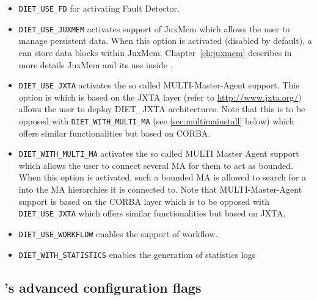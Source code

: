 \begin{itemize}
\item
  \verb+DIET_USE_FD+ for activating Fault Detector.

\item 
  \verb+DIET_USE_JUXMEM+ activates \diet support of JuxMem which
  allows the user to manage persistent data. When this option is
  activated (disabled by default), a \sed can store data blocks within
  JuxMem. Chapter~\ref{ch:juxmem} describes in more details JuxMem
  and its use inside \diet.

\item
  \verb+DIET_USE_JXTA+ activates the so called MULTI-Master-Agent
  support. This option is which is based on the JXTA layer (refer to
  \url{http://www.jxta.org/}) allows the user to deploy DIET\_JXTA
  architectures. Note that this is to be opposed with
  \verb+DIET_WITH_MULTI_MA+ (see \ref{sec:multimainstall} below) which
  offers similar functionalities but based on CORBA.

\item
  \label{sec:multimainstall}
  \verb+DIET_WITH_MULTI_MA+ activates the so called MULTI Master Agent
  support which allows the user to connect several MA for them to act
  as bounded.
  When this option is activated, such a bounded MA is allowed to search
  for a \sed into the MA hierarchies it is connected to.
  Note that MULTI-Master-Agent support is based on the CORBA layer
  which is to be opposed with \verb+DIET_USE_JXTA+ which offers similar
  functionalities but based on JXTA.

\item
  \verb+DIET_USE_WORKFLOW+ enables the support of workflow.

\item
  \verb+DIET_WITH_STATISTICS+ enables the generation of statistics logs
\end{itemize}

\subsection{\diet's advanced configuration flags}
\noindent

